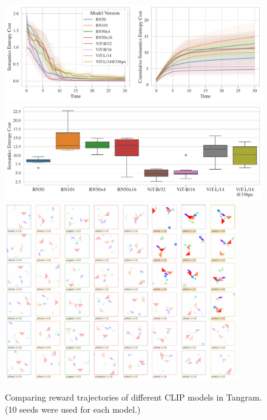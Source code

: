 \begin{figure}[H]
    \centering    
    \includegraphics[width=\textwidth]{images/model_comparison_color.pdf}
    \includegraphics[width=\textwidth]{images/model_comparison_boxplot_color.pdf}
    \includegraphics[width=0.9\textwidth]{images/model_samples_color.pdf}
    \captionsetup{justification=centering}
    \caption[Comparing reward trajectories of CLIP models in Tangram.]{Comparing reward trajectories of different CLIP models in Tangram.\\(10 seeds were used for each model.)}
    \label{fig:clip-traj-comparison-color}
\end{figure}


